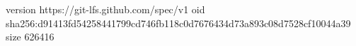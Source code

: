 version https://git-lfs.github.com/spec/v1
oid sha256:d91413fd54258441799cd746fb118c0d7676434d73a893c08d7528cf10044a39
size 626416

